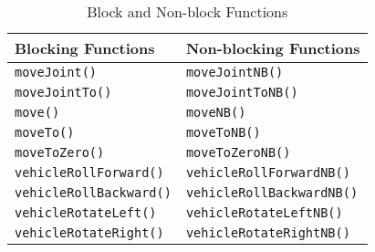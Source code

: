 \begin{center}
    \begin{longtable}{ p{7cm}p{7cm}}
\caption{Block and Non-block Functions\label{tab:block_nonblock}}\\
\hline
Blocking Functions & Non-blocking Functions\\
\hline
\texttt{moveJoint()}            &\texttt{moveJointNB()}\\
\texttt{moveJointTo()}          &\texttt{moveJointToNB()}\\
\texttt{move()}                 &\texttt{moveNB()}\\
\texttt{moveTo()}               &\texttt{moveToNB()}\\
\texttt{moveToZero()}           &\texttt{moveToZeroNB()}\\
\texttt{vehicleRollForward()}      &\texttt{vehicleRollForwardNB()}\\
\texttt{vehicleRollBackward()}     &\texttt{vehicleRollBackwardNB()}\\
\texttt{vehicleRotateLeft()}       &\texttt{vehicleRotateLeftNB()}\\
\texttt{vehicleRotateRight()}      &\texttt{vehicleRotateRightNB()}\\
\hline
\end{longtable}
\end{center}
